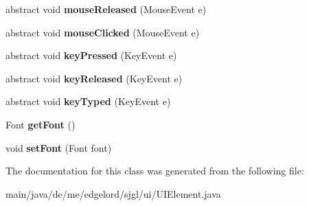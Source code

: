 \begin{DoxyCompactItemize}
\mbox{\label{classde_1_1me_1_1edgelord_1_1sjgl_1_1ui_1_1_u_i_element_a69ca18ac97dd882d79bb2de442b49d98}} 
abstract void {\bfseries mouse\+Released} (Mouse\+Event e)
\item 
\mbox{\label{classde_1_1me_1_1edgelord_1_1sjgl_1_1ui_1_1_u_i_element_a6bbecc252b6b22f1b50620ec4fee8cab}} 
abstract void {\bfseries mouse\+Clicked} (Mouse\+Event e)
\item 
\mbox{\label{classde_1_1me_1_1edgelord_1_1sjgl_1_1ui_1_1_u_i_element_addd89d91274e0a06f0b281b273fccdb1}} 
abstract void {\bfseries key\+Pressed} (Key\+Event e)
\item 
\mbox{\label{classde_1_1me_1_1edgelord_1_1sjgl_1_1ui_1_1_u_i_element_aa3d632d16e5d833d76b68e46f8839f98}} 
abstract void {\bfseries key\+Released} (Key\+Event e)
\item 
\mbox{\label{classde_1_1me_1_1edgelord_1_1sjgl_1_1ui_1_1_u_i_element_aee2547f4d49df8e957550b0ff335ddfa}} 
abstract void {\bfseries key\+Typed} (Key\+Event e)
\item 
\mbox{\label{classde_1_1me_1_1edgelord_1_1sjgl_1_1ui_1_1_u_i_element_a9d050cadba791e796b586c0f76a67b70}} 
Font {\bfseries get\+Font} ()
\item 
\mbox{\label{classde_1_1me_1_1edgelord_1_1sjgl_1_1ui_1_1_u_i_element_a8b7e4eb4c0d8c85ec7a49f8852e3178b}} 
void {\bfseries set\+Font} (Font font)
\end{DoxyCompactItemize}


The documentation for this class was generated from the following file\+:\begin{DoxyCompactItemize}
\item 
main/java/de/me/edgelord/sjgl/ui/U\+I\+Element.\+java\end{DoxyCompactItemize}
